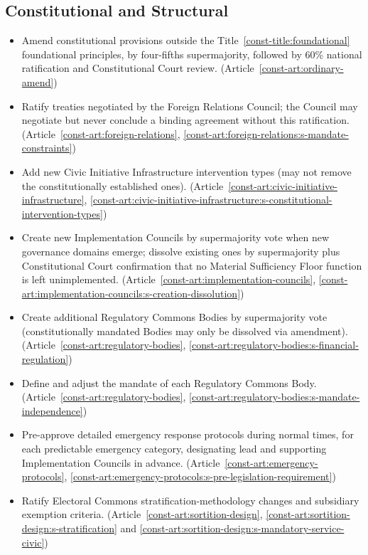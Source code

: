 \documentclass[11pt]{article}
\begin{document}
\subsection{Constitutional and Structural}
\begin{itemize}
  \item Amend constitutional provisions outside the Title~\ref{const-title:foundational} foundational principles, by four-fifths supermajority, followed by 60\% national ratification and Constitutional Court review. (Article~\ref{const-art:ordinary-amend})
  \item Ratify treaties negotiated by the Foreign Relations Council; the Council may negotiate but never conclude a binding agreement without this ratification. (Article~\ref{const-art:foreign-relations}, \ref{const-art:foreign-relations:s-mandate-constraints})
  \item Add new Civic Initiative Infrastructure intervention types (may not remove the constitutionally established ones). (Article~\ref{const-art:civic-initiative-infrastructure}, \ref{const-art:civic-initiative-infrastructure:s-constitutional-intervention-types})
  \item Create new Implementation Councils by supermajority vote when new governance domains emerge; dissolve existing ones by supermajority plus Constitutional Court confirmation that no Material Sufficiency Floor function is left unimplemented. (Article~\ref{const-art:implementation-councils}, \ref{const-art:implementation-councils:s-creation-dissolution})
  \item Create additional Regulatory Commons Bodies by supermajority vote (constitutionally mandated Bodies may only be dissolved via amendment). (Article~\ref{const-art:regulatory-bodies}, \ref{const-art:regulatory-bodies:s-financial-regulation})
  \item Define and adjust the mandate of each Regulatory Commons Body. (Article~\ref{const-art:regulatory-bodies}, \ref{const-art:regulatory-bodies:s-mandate-independence})
  \item Pre-approve detailed emergency response protocols during normal times, for each predictable emergency category, designating lead and supporting Implementation Councils in advance. (Article~\ref{const-art:emergency-protocols}, \ref{const-art:emergency-protocols:s-pre-legislation-requirement})
  \item Ratify Electoral Commons stratification-methodology changes and subsidiary exemption criteria. (Article~\ref{const-art:sortition-design}, \ref{const-art:sortition-design:s-stratification} and \ref{const-art:sortition-design:s-mandatory-service-civic})
\end{itemize}
\end{document}

